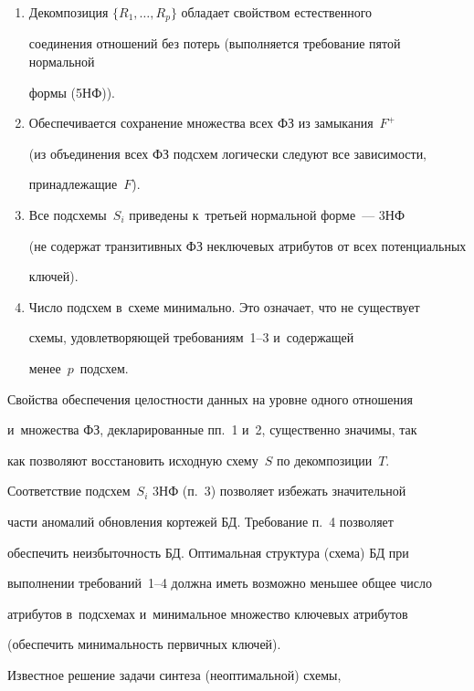   \begin{enumerate}[1.]

  \item Декомпозиция $\{R_1, \ldots , R_p\}$ обладает свойством естественного 

соединения отношений без потерь (выполняется требование пятой нормальной 

формы (5НФ)). 

  \item  Обеспечивается сохранение множества всех ФЗ из замыкания~$F^+$ 

(из объединения всех ФЗ подсхем логически следуют все зависимости, 

принадлежащие~$F$). 

  \item  Все подсхемы~$S_i$ приведены к~третьей нормальной форме~--- 3НФ 

(не содержат транзитивных ФЗ неключевых атрибутов от всех потенциальных 

ключей). 

  \item  Число подсхем в~схеме минимально. Это означает, что не существует 

схемы, удовлетворяющей требованиям~1--3 и~содержащей 

менее~$p$~подсхем. 

  \end{enumerate}

  

  Свойства обеспечения целостности данных на уровне одного отношения 

  и~множества ФЗ, декларированные пп.~1 и~2, существенно значимы, так 

как позволяют восстановить исходную схему~$S$ по декомпозиции~$T$. 

Соответствие подсхем~$S_i$ 3НФ (п.~3) позволяет избежать значительной 

части аномалий обновления кортежей БД. Требование п.~4 позволяет 

обеспечить неизбыточность БД. Оптимальная структура (схема) БД при 

выполнении требований~1--4 должна иметь возможно меньшее общее число 

атрибутов в~подсхемах и~минимальное множество ключевых атрибутов 

(обеспечить минимальность первичных ключей). 

  

  Известное решение задачи синтеза (неоптимальной) схемы, 

